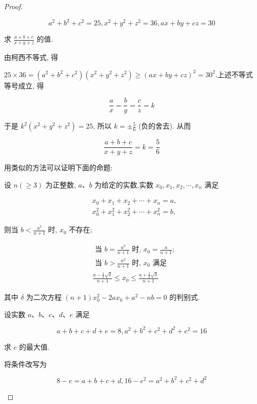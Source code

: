 \begin{proof}
\begin{example}
\begin{solution}
\begin{example}
	$$
	a^{2}+b^{2}+c^{2}=25, x^{2}+y^{2}+z^{2}=36, a x+b y+c z=30
	$$
	
	求 $\frac{a+b+c}{x+y+z}$ 的值.
\end{example}
\begin{solution}
	由柯西不等式, 得
	
	$25 \times 36=\left(a^{2}+b^{2}+c^{2}\right)\left(x^{2}+y^{2}+z^{2}\right) \geqslant(a x+b y+c z)^{2}=30^{2}$.上述不等式等号成立, 得
	
	$$
	\frac{a}{x}=\frac{b}{y}=\frac{c}{z}=k
	$$
	
	于是 $k^{2}\left(x^{2}+y^{2}+z^{2}\right)=25$, 所以 $k= \pm \frac{5}{6}$ (负的舍去). 从而
	
	$$
	\frac{a+b+c}{x+y+z}=k=\frac{5}{6}
	$$
\end{solution}
\begin{note}
	用类似的方法可以证明下面的命题:
	
	设 $n(\geqslant 3)$ 为正整数, $a 、 b$ 为给定的实数,实数 $x_{0}, x_{1}, x_{2}, \cdots, x_{n}$ 满足
	
	$$
	\begin{aligned}
	& x_{0}+x_{1}+x_{2}+\cdots+x_{n}=a, \\
	& x_{0}^{2}+x_{1}^{2}+x_{2}^{2}+\cdots+x_{n}^{2}=b,
	\end{aligned}
	$$
	
	则当 $b<\frac{a^{2}}{n+1}$ 时, $x_{0}$ 不存在;
	
	$$
	\begin{aligned}
	& \text { 当 } b=\frac{a^{2}}{n+1} \text { 时, } x_{0}=\frac{a}{n+1} \text {; } \\
	& \text { 当 } b>\frac{a^{2}}{n+1} \text { 时, } x_{0} \text { 满足 } \\
	& \frac{a-\frac{1}{2} \sqrt{\delta}}{n+1} \leqslant x_{0} \leqslant \frac{a+\frac{1}{2} \sqrt{\delta}}{n+1}
	\end{aligned}
	$$
	
	其中 $\delta$ 为二次方程 $(n+1) x_{0}^{2}-2 a x_{0}+a^{2}-n b=0$ 的判别式.
\end{note}

\begin{example}
	设实数 $a 、 b 、 c 、 d 、 e$ 满足
	
	$$
	a+b+c+d+e=8, a^{2}+b^{2}+c^{2}+d^{2}+e^{2}=16
	$$
	
	求 $e$ 的最大值.
\end{example}
\begin{solution}
	将条件改写为
	
	$$
	8-e=a+b+c+d, 16-e^{2}=a^{2}+b^{2}+c^{2}+d^{2}
	$$
	

\end{solution}
\end{solution}
\end{example}
\end{proof}
